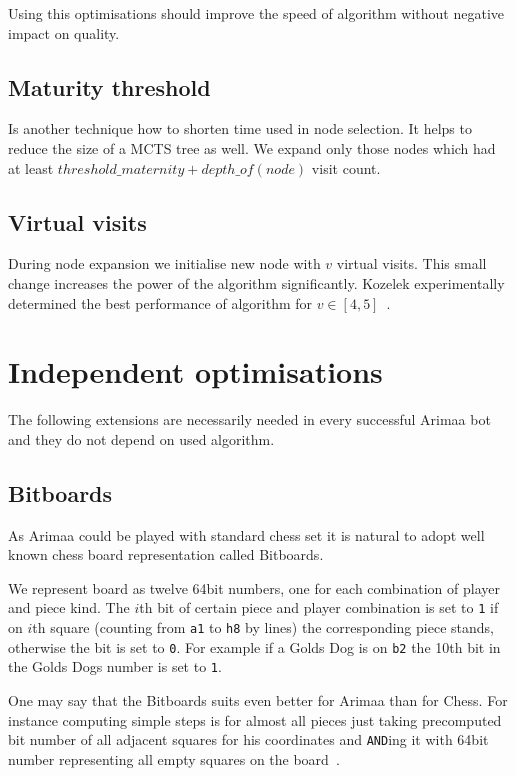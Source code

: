 Using this optimisations should improve the speed of algorithm without negative
impact on quality.

\subsection{Maturity threshold}
Is another technique how to shorten time used in node selection. It helps to
reduce the size of a MCTS tree as well. We expand only those nodes which had
at least $threshold\_maternity + depth\_of(node)$ visit count.

\subsection{Virtual visits}
During node expansion we initialise new node with $v$ virtual visits. This
small change increases the power of the algorithm significantly. Kozelek
experimentally determined the best performance of algorithm for $v \in
[4,5]$~\cite{KOZELEK}.

\section{Independent optimisations}
The following extensions are necessarily needed in every successful Arimaa bot
and they do not depend on used algorithm.

	\subsection{Bitboards}
	As Arimaa could be played with standard chess set it is natural to adopt
	well known chess board representation called Bitboards.

	We represent board as twelve 64bit numbers, one for each combination of
	player and piece kind. The $i$th bit of certain piece and player
	combination is set to \texttt{1} if on $i$th square (counting from
	\texttt{a1} to \texttt{h8} by lines) the corresponding piece stands,
	otherwise the bit is set to \texttt{0}. For example if a Golds Dog is on
	\texttt{b2} the 10th bit in the Golds Dogs number is set to \texttt{1}.

	One may say that the Bitboards suits even better for Arimaa than for Chess.
	For instance computing simple steps is for almost all pieces just taking
	precomputed bit number of all adjacent squares for his coordinates and
	\texttt{AND}ing it with 64bit number representing all empty
	squares on the board~\cite{BitboardAnalysis}.

